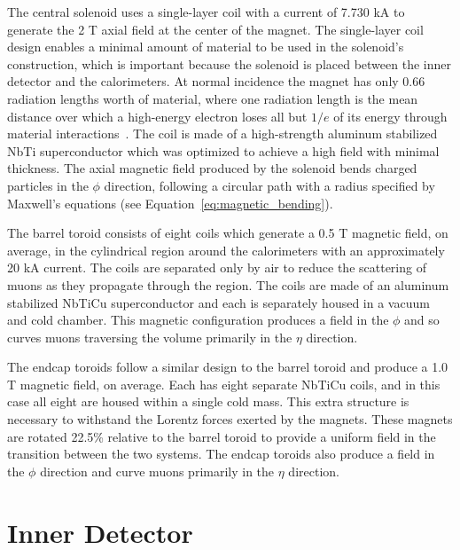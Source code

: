 The central solenoid uses a single-layer coil with a current of 7.730 kA to generate the 2 T axial field at the center of the magnet. 
The single-layer coil design enables a minimal amount of material to be used in the solenoid's construction, which is important because the solenoid is placed between the inner detector and the calorimeters.
At normal incidence the magnet has only 0.66 radiation lengths worth of material, where one radiation length is the mean distance over which a high-energy electron loses all but $1/e$ of its energy through material interactions~\cite{pdg}.
The coil is made of a high-strength aluminum stabilized NbTi superconductor which was optimized to achieve a high field with minimal thickness.
The axial magnetic field produced by the solenoid bends charged particles in the $\phi$ direction, following a circular path with a radius specified by Maxwell's equations (see Equation~\ref{eq:magnetic_bending}). 

The barrel toroid consists of eight coils which generate a 0.5 T magnetic field, on average, in the cylindrical region around the calorimeters with an approximately 20 kA current.
The coils are separated only by air to reduce the scattering of muons as they propagate through the region.
The coils are made of an aluminum stabilized NbTiCu superconductor and each is separately housed in a vacuum and cold chamber.
This magnetic configuration produces a field in the $\phi$ and so curves muons traversing the volume primarily in the $\eta$ direction.

The endcap toroids follow a similar design to the barrel toroid and produce a 1.0 T magnetic field, on average. 
Each has eight separate NbTiCu coils, and in this case all eight are housed within a single cold mass.
This extra structure is necessary to withstand the Lorentz forces exerted by the magnets. 
These magnets are rotated 22.5\% relative to the barrel toroid to provide a uniform field in the transition between the two systems. 
The endcap toroids also produce a field in the $\phi$ direction and curve muons primarily in the $\eta$ direction.


\section{Inner Detector}
\label{sec:inner_detector}

